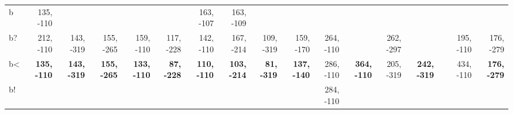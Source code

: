 \begin{table}[p]
{\begin{tabular}{lrrrrrrrrrrrrrrrr}
b & 135, -110 &  &  &  &  & 163, -107 & 163, -109 &  &  &  &  &  &  &  &  &  \\
b? & 212, -110 & 143, -319 & 155, -265 & 159, -110 & 117, -228 & 142, -110 & 167, -214 & 109, -319 & 159, -170 & 264, -110 &  & 262, -297 &  &  & 195, -110 & 176, -279 \\
b< & \textbf{135, -110} & \textbf{143, -319} & \textbf{155, -265} & \textbf{133, -110} & \textbf{87, -228} & \textbf{110, -110} & \textbf{103, -214} & \textbf{81, -319} & \textbf{137, -140} & 286, -110 & \textbf{364, -110} & 205, -319 & \textbf{242, -319} &  & 434, -110 & \textbf{176, -279} \\
b! &  &  &  &  &  &  &  &  &  & 284, -110 &  &  &  &  &  &  \\

\end{tabular}
}
\end{table}
\clearpage


